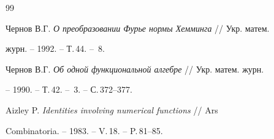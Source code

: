 \begin{thebibliography}{99}


Чернов В.Г. {\em О преобразовании Фурье нормы Хемминга} // Укр. матем. 


журн. -- 1992. -- Т.\,44. -- \No\,8.




Чернов В.Г. {\em Об одной функциональной алгебре} // Укр. матем. журн. 


-- 1990. -- Т.\,42. -- \No\,3. -- С.\,372--377. 




Aizley P. {\em Identities involving numerical functions} // Ars 


Combinatoria. -- 1983. -- V.\,18. -- P.\,81--85. 


 


 


\end{thebibliography} 


 


\vskip 0.5cm 


 






 


\label{end} 


 


 


